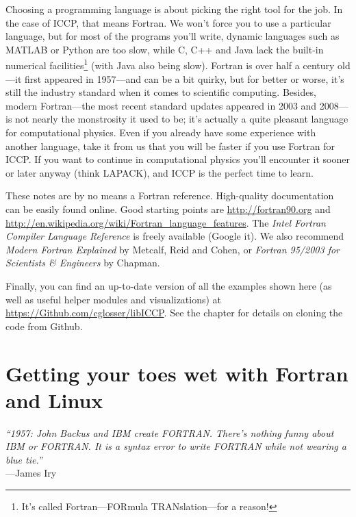 \documentclass[openany,oneside]{report}
\renewenvironment{quote}{\list{}{\leftmargin=8\parindent}\item\relax}{\endlist}
\begin{document}
Choosing a programming language is about picking the right tool for the job.
In the case of ICCP, that means Fortran.
We won't force you to use a particular language, but for most of the programs you'll write, dynamic languages such as MATLAB or Python are too slow, while C, C++ and Java lack the built-in numerical facilities\footnote{It's called Fortran---FORmula TRANslation---for a reason!} (with Java also being slow).
Fortran is over half a century old---it first appeared in 1957---and can be a bit quirky, but for better or worse, it's still the industry standard when it comes to scientific computing.
Besides, modern Fortran---the most recent standard updates appeared in 2003 and 2008---is not nearly the monstrosity it used to be; it's actually a quite pleasant language for computational physics.
Even if you already have some experience with another language, take it from us that you will be faster if you use Fortran for ICCP.
If you want to continue in computational physics you'll encounter it sooner or later anyway (think LAPACK), and ICCP is the perfect time to learn.

These notes are by no means a Fortran reference.
High-quality documentation can be easily found online.
Good starting points are \url{http://fortran90.org} and \url{http://en.wikipedia.org/wiki/Fortran_language_features}.
The \emph{Intel Fortran Compiler Language Reference} is freely available (Google it).
We also recommend \emph{Modern Fortran Explained} by Metcalf, Reid and Cohen, or \emph{Fortran 95/2003 for Scientists \& Engineers} by Chapman.

Finally, you can find an up-to-date version of all the examples shown here (as well as useful helper modules and visualizations) at \url{https://Github.com/cglosser/libICCP}.
See the  chapter for details on cloning the code from Github.

\chapter{Getting your toes wet with Fortran and Linux}
\label{chap:Getting your toes wet}
\begin{quote}\small
  \emph{``1957: John Backus and IBM create FORTRAN. There's nothing funny about IBM or FORTRAN. It is a syntax error to write FORTRAN while not wearing a blue tie.''} \\ \hspace*{\fill}---James Iry
\end{quote}
\end{document}
